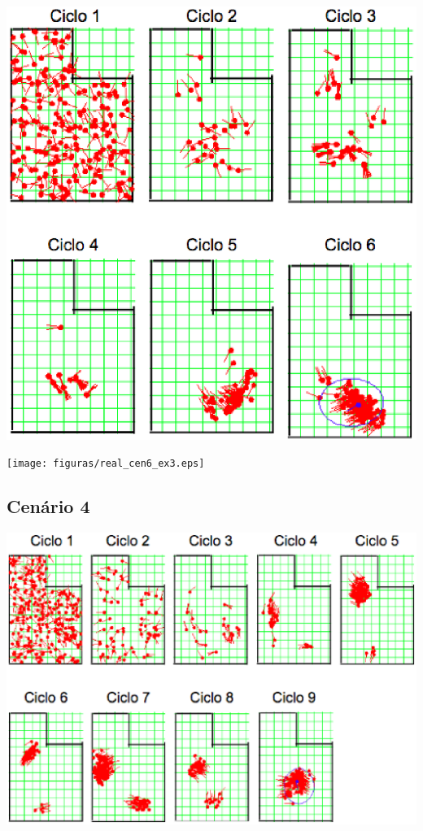 {\centering
\includegraphics[scale=0.4]{figuras/cen6_ex3.eps}
\label{img:cen6_ex3}
\par}

{\centering
\texttt{[image: figuras/real\_cen6\_ex3.eps]}
\label{img:real_cen6_ex3}
\par}

\subsection{Cenário 4}

{\centering
\includegraphics[scale=0.4]{figuras/cen6_ex4.eps}
\label{img:cen6_ex4}
\par}

